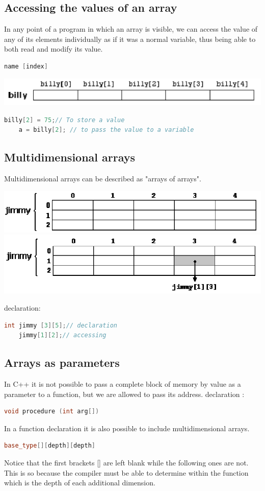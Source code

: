 \documentclass[12pt,oneside]{book}
\begin{document}
\subsection{Accessing the values of an array}
In any point of a program in which an array is visible, we can access the value of any of its elements individually as if it was a normal variable, thus being able to both read and modify its value.
	\begin{lstlisting}[language=C++]
    name [index]
\end{lstlisting}
\begin{center}
	\includegraphics[width=0.5\linewidth]{../pic/3316/26.png}
\end{center}
\begin{lstlisting}[language=C++]
    billy[2] = 75;// To store a value 
    a = billy[2]; // to pass the value to a variable
\end{lstlisting}
\subsection{Multidimensional arrays}
Multidimensional arrays can be described as "arrays of arrays".
\begin{center}
	\includegraphics[width=0.5\linewidth]{../pic/3316/27.png}\\
	\includegraphics[width=0.5\linewidth]{../pic/3316/28.png}
\end{center}
declaration:
\begin{lstlisting}[language=C++]
    int jimmy [3][5];// declaration 
    jimmy[1][2];// accessing 
\end{lstlisting}
\subsection{Arrays as parameters}
In C++ it is not possible to pass a complete block of memory by value as a parameter to a function, but we are allowed to pass its address.
declaration :
\begin{lstlisting}[language=C++]
    void procedure (int arg[])
\end{lstlisting}
In a function declaration it is also possible to include multidimensional arrays.
	\begin{lstlisting}[language=C++]
    base_type[][depth][depth]
\end{lstlisting}
Notice that the first brackets [] are left blank while the following ones are not. This is so because the compiler must be able to determine within the function which is the depth of each additional dimension.
\end{document}
